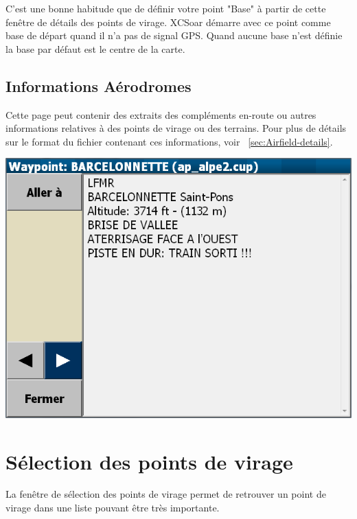 C'est une bonne habitude que de définir votre point "Base" à partir de cette fenêtre de détails des points de virage. XCSoar démarre avec ce point comme  base de départ quand il n'a pas de signal GPS. Quand aucune base n'est définie la base par défaut est le centre de la carte.

\subsection*{Informations Aérodromes}
Cette page peut contenir des extraits des compléments en-route ou autres informations relatives à des points de virage ou des terrains. Pour plus de détails sur le format du fichier contenant ces informations, voir ~\ref{sec:Airfield-details}.

\begin{center}
\includegraphics[angle=0,width=0.8\linewidth,keepaspectratio='true']{figures/dialog-waypointdetails1.png}
\end{center}


\section{Sélection des points de virage}\label{sec:waypoint-selector-dialog}
La fenêtre de sélection des points de virage permet de retrouver un point de virage dans une liste pouvant être très importante.

